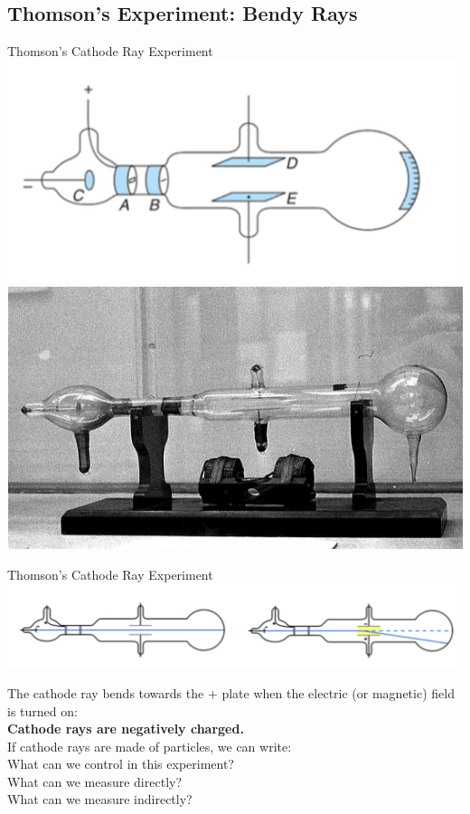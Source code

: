 %
\subsection{Thomson's Experiment: Bendy Rays}




\begin{frame}{Thomson's Cathode Ray Experiment}
\small
\includegraphics[scale=0.4]{cathode1}
\includegraphics[scale=0.4]{cathode2}
\end{frame}



\begin{frame}{Thomson's Cathode Ray Experiment}
\small
\includegraphics[scale=0.4]{cathode3}

The cathode ray bends towards the + plate when the electric (or magnetic) field is turned on: \\[3ex]

\textbf{Cathode rays are negatively charged.}\\
If cathode rays are made of particles, we can write:\\[4ex]

What can we control in this experiment?\\[2ex]
What can we measure directly?\\[2ex]
What can we measure indirectly?\\[2ex]

\end{frame}



